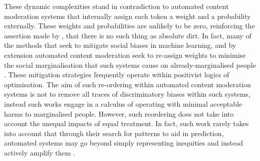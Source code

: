 These dynamic complexities stand in contradiction to automated content moderation systems that internally assign each token a weight and a probability externally. 
These weights and probabilities are unlikely to be zero, reinforcing the assertion made by \citet{Douglas:1966}, that there is no such thing as absolute dirt.
In fact, many of the methods that seek to mitigate social biases in machine learning, and by extension automated content moderation seek to re-assign weights to minimise the social marginalisation that such systems cause on already-marginalised people \cite{Liu:2019}.
These mitigation strategies frequently operate within positivist logics of optimisation.
The aim of such re-ordering within automated content moderation systems is not to remove all traces of discriminatory biases within such systems, instead such works engage in a calculus of operating with minimal acceptable harms to marginalised people.
However, such reordering does not take into account the unequal impacts of equal treatment. 
In fact, such work rarely takes into account that through their search for patterns to aid in prediction, automated systems may go beyond simply representing inequities and instead actively amplify them \citep{Zhao:2017}.
\vspace{5mm}

